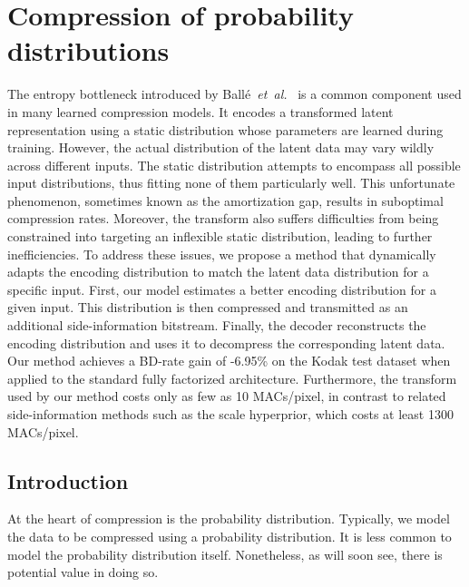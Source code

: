 \chapter{Compression of probability distributions}
\label{ch:pdf_compression}




\begin{chapabstract}
  The entropy bottleneck introduced by Ballé~\emph{et~al.}~\cite{balle2018variational} is a common component used in many learned compression models.
  It encodes a transformed latent representation using a static distribution whose parameters are learned during training.
  However, the actual distribution of the latent data may vary wildly across different inputs.
  The static distribution attempts to encompass all possible input distributions, thus fitting none of them particularly well.
  This unfortunate phenomenon, sometimes known as the amortization gap, results in suboptimal compression rates.
  Moreover, the transform also suffers difficulties from being constrained into targeting an inflexible static distribution, leading to further inefficiencies.
  To address these issues, we propose a method that dynamically adapts the encoding distribution to match the latent data distribution for a specific input.
  First, our model estimates a better encoding distribution for a given input.
  This distribution is then compressed and transmitted as an additional side-information bitstream.
  Finally, the decoder reconstructs the encoding distribution and uses it to decompress the corresponding latent data.
  Our method achieves a BD-rate gain of -6.95\% on the Kodak test dataset when applied to the standard fully factorized architecture.
  Furthermore, the transform used by our method costs only as few as 10 MACs/pixel, in contrast to related side-information methods such as the scale hyperprior, which costs at least 1300 MACs/pixel.
\end{chapabstract}




\section{Introduction}
\label{sec:pdf_compression/intro}

At the heart of compression is the probability distribution.
Typically, we model the data to be compressed using a probability distribution.
It is less common to model the probability distribution itself.
Nonetheless, as will soon see, there is potential value in doing so.

